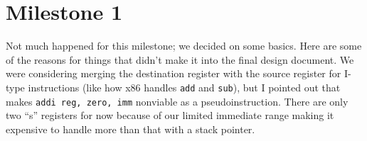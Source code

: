 \documentclass{report}
\begin{document}
\chapter{Milestone 1}
Not much happened for this milestone; we decided on some basics.
Here are some of the reasons for things that didn't make it into the final design document.
We were considering merging the destination register with the source register for I-type instructions (like how x86 handles \texttt{add} and \texttt{sub}), but I pointed out that makes \texttt{addi reg, zero, imm} nonviable as a pseudoinstruction.
There are only two ``s'' registers for now because of our limited immediate range making it expensive to handle more than that with a stack pointer.
\end{document}
